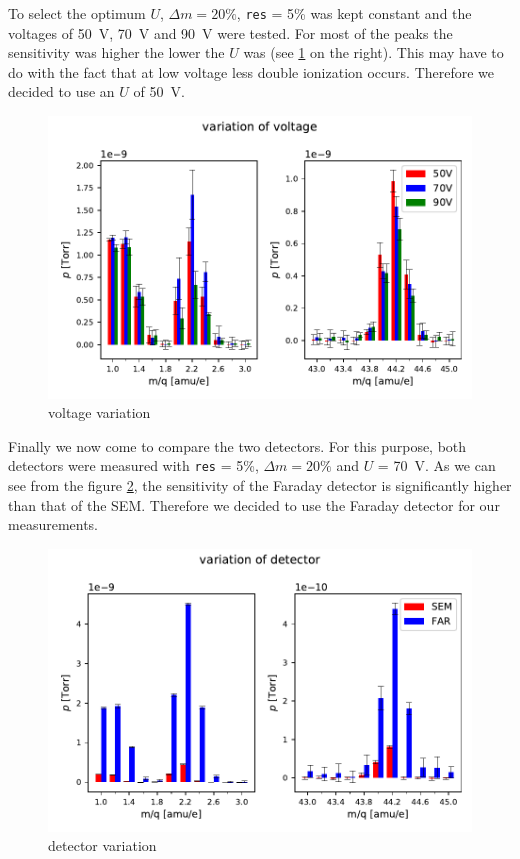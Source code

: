     To select the optimum $U$, $\Delta m = 20 \%$, \texttt{res} = 5\% was kept constant and the voltages of 50~V, 70~V and 90~V were tested. For most of the peaks the sensitivity was higher the lower the $U$ was (see \ref{fig:voltage_variation} on the right). This may have to do with the fact that at low voltage less double ionization occurs. Therefore we decided to use an $U$ of 50~V.  
    
    \begin{figure}[h!]
        \centering
        \includegraphics[width=1 \textwidth]{Report/DataResultsPlots/voltage_variation_h2_and_co2.pdf}
        \caption{voltage variation}
        \label{fig:voltage_variation}
    \end{figure}
    
    Finally we now come to compare the two detectors. For this purpose, both detectors were measured with \texttt{res} = 5\%, $\Delta m = 20\%$ and $U$ = 70~V. As we can see from the figure \ref{fig:detector_variation}, the sensitivity of the Faraday detector is significantly higher than that of the SEM. Therefore we decided to use the Faraday detector for our measurements. 
    \begin{figure}[h!]
        \centering
        \includegraphics[width=1 \textwidth]{Report/DataResultsPlots/detector_variation_h2_and_co2.pdf}
        \caption{detector variation}
        \label{fig:detector_variation}
    \end{figure}
    
